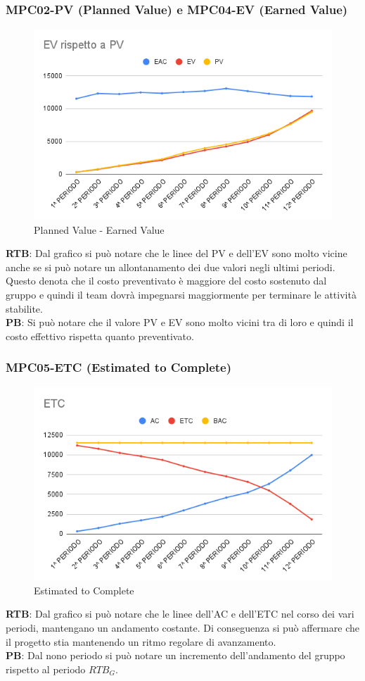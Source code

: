 \subsubsection{MPC02-PV (Planned Value) e MPC04-EV (Earned Value)}
\begin{figure}[H]
  \centering
  \includegraphics[width=0.7\linewidth]{grafici/EV_PV.png}
  \caption{Planned Value - Earned Value}
\end{figure}
\textbf{RTB}: Dal grafico si può notare che le linee del PV e dell'EV sono molto vicine anche se si può notare un allontanamento dei due valori negli ultimi periodi. Questo denota che il costo preventivato è maggiore del costo sostenuto dal gruppo e quindi il team dovrà impegnarsi maggiormente per terminare le attività stabilite.
\\\textbf{PB}: Si può notare che il valore PV e EV sono molto vicini tra di loro e quindi il costo effettivo rispetta quanto preventivato.
\subsubsection{MPC05-ETC (Estimated to Complete)}
\begin{figure}[H]
  \centering
  \includegraphics[width=0.7\linewidth]{grafici/ETC.png}
  \caption{Estimated to Complete}
\end{figure}
\textbf{RTB}: Dal grafico si può notare che le linee dell'AC e dell'ETC nel corso dei vari periodi, mantengano un andamento costante. Di conseguenza si può affermare che il progetto stia mantenendo un ritmo regolare di avanzamento. 
\\\textbf{PB}: Dal nono periodo si può notare un incremento dell'andamento del gruppo rispetto al periodo $\textit{RTB}_G$.
